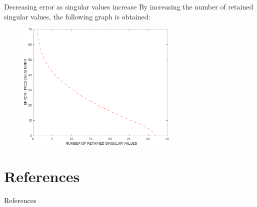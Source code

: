 \documentclass[10pt]{beamer}
\begin{document}
\begin{frame}{Decreasing error as singular values increase}
    By increasing the number of retained singular values, the following graph is obtained:
    \begin{figure}[t]
        \includegraphics[width=7.7cm]{error_wrt_A.pdf}
        \centering
    \end{figure}
\end{frame}

\section{References}
\begin{frame}{References}
    \printbibliography
\end{frame}
\end{document}
